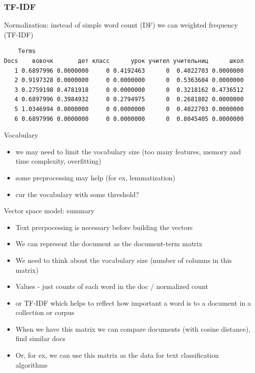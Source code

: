 \documentclass[svgnames]{beamer}
\begin{document}
\begin{frame}[fragile]
  \frametitle{TF-IDF}
  Normalization: instead of simple word count (DF) we can weighted frequency  (TF-IDF)
  \footnotesize
\begin{verbatim}
    Terms
Docs    вовочк       дет класс      урок учител учительниц      школ
   1 0.6897996 0.0000000     0 0.4192463      0  0.4022703 0.0000000
   2 0.9197328 0.0000000     0 0.0000000      0  0.5363604 0.0000000
   3 0.2759198 0.4781918     0 0.0000000      0  0.3218162 0.4736512
   4 0.6897996 0.3984932     0 0.2794975      0  0.2681802 0.0000000
   5 1.0346994 0.0000000     0 0.0000000      0  0.4022703 0.0000000
   6 0.6897996 0.0000000     0 0.0000000      0  0.8045405 0.0000000
\end{verbatim}
\end{frame}

\begin{frame}{Vocabulary}
  \begin{itemize}
    \item we may need to limit the vocabulary size (too many features, memory and time complexity, overfitting)
    \item some preprocessing may help (for ex, lemmatization)
    \item cur the vocabulary with some threshold?
  \end{itemize}
\end{frame}

\begin{frame}{Vector space model: summary}
  \begin{itemize}
    \item Text prerpocessing is necessary before building the vectors
    \item We can represent the document as the document-term matrix
    \item We need to think about the vocabulary size (number of columns in this matrix)
    \item Values - just counts of each word in the doc / normalized count
    \item or TF-IDF which helps to reflect how important a word is to a document in a collection or corpus
    \item When we have this matrix we can compare documents (with cosine distance), find similar docs
    \item Or, for ex, we can use this matrix as the data for text classification algorithms
  \end{itemize}
\end{frame}
\end{document}
